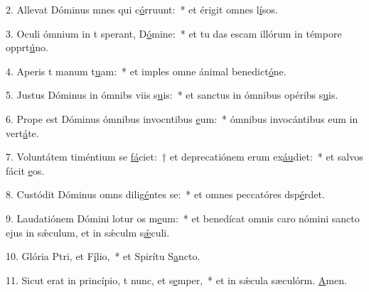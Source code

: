 2. Allevat Dóminus mnes qui c\uline{ó}rruunt:~* et érigit omnes l\uline{í}sos.\par 
3. Oculi ómnium in t sperant, D\uline{ó}mine:~* et tu das escam illórum in témpore opprt\uline{ú}no.\par 
4. Aperis t manum t\uline{u}am:~* et imples omne ánimal benedict\uline{ó}ne.\par 
5. Justus Dóminus in ómnibs viis s\uline{u}is:~* et sanctus in ómnibus opéribs s\uline{u}is.\par 
6. Prope est Dóminus ómnibus invocntibus \uline{e}um:~* ómnibus invocántibus eum in vert\uline{á}te.\par 
7. Voluntátem timéntium se \uline{fá}ciet:~† et deprecatiónem erum ex\uline{áu}diet:~* et salvos fácit \uline{e}os.\par 
8. Custódit Dóminus omns dilig\uline{é}ntes se:~* et omnes peccatóres dsp\uline{é}rdet.\par 
9. Laudatiónem Dómini lotur os m\uline{e}um:~* et benedícat omnis caro nómini sancto ejus in sǽculum, et in sǽculm s\uline{ǽ}culi.\par 
10. Glória Ptri, et F\uline{í}lio,~* et Spirítu S\uline{a}ncto.\par 
11. Sicut erat in princípio, t nunc, et s\uline{e}mper,~* et in sǽcula sæculórm. \uline{A}men.\par 
